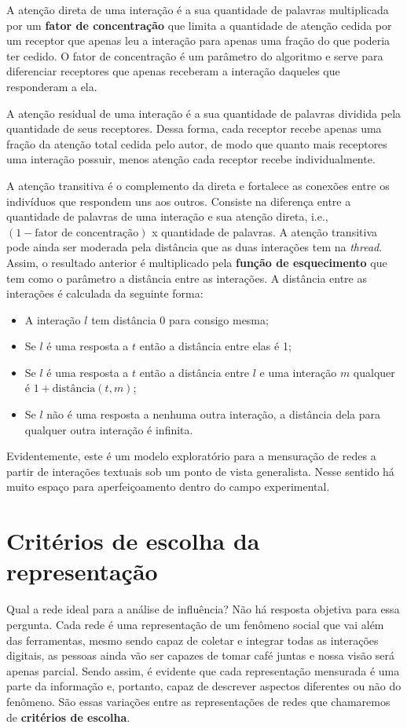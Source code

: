 A atenção direta de uma interação é a sua quantidade de palavras multiplicada
por um \textbf{fator de concentração} que limita a quantidade de atenção cedida
por um receptor que apenas leu a interação para apenas uma fração do que poderia
ter cedido. O fator de concentração é um parâmetro do algoritmo e
serve para diferenciar receptores que apenas receberam a interação
daqueles que responderam a ela. 

A atenção residual de uma interação é a sua quantidade de palavras dividida pela
quantidade de seus receptores. Dessa forma, cada receptor recebe apenas uma
fração da atenção total cedida pelo autor, de modo que quanto mais receptores
uma interação possuir, menos atenção cada receptor recebe individualmente.

A atenção transitiva é o complemento da direta e fortalece as conexões entre os
indivíduos que respondem uns aos outros. Consiste na diferença entre a
quantidade de palavras de uma interação e sua atenção direta, i.e., $(1 -
\text{fator de concentração})$ x quantidade de palavras. A atenção transitiva
pode ainda ser moderada pela distância que as duas interações tem na
\emph{thread}. Assim, o resultado anterior é multiplicado pela \textbf{função de
esquecimento} que tem como o parâmetro a distância entre as interações. A
distância entre as interações é calculada da seguinte forma:

\begin{itemize}
  \item A interação $l$ tem distância 0 para consigo mesma;
  \item Se $l$ é uma resposta a $t$ então a distância entre elas é 1;
  \item Se $l$ é uma resposta a $t$ então a distância entre $l$ e uma interação
  $m$ qualquer é $1 + \text{distância}(t, m)$;
  \item Se $l$ não é uma resposta a nenhuma outra interação, a distância dela
  para qualquer outra interação é infinita.
\end{itemize}

Evidentemente, este é um modelo exploratório para a mensuração de redes a partir
de interações textuais sob um ponto de vista generalista. Nesse sentido há muito
espaço para aperfeiçoamento dentro do campo experimental.

\section{Critérios de escolha da representação}
\label{sec:criterios}
Qual a rede ideal para a análise de influência? Não há resposta objetiva para
essa pergunta. Cada rede é uma representação de um fenômeno social que vai além
das ferramentas, mesmo sendo capaz de coletar e integrar todas as interações
digitais, as pessoas ainda vão ser capazes de tomar café juntas e nossa visão
será apenas parcial. Sendo assim, é evidente que cada representação mensurada é
uma parte da informação e, portanto, capaz de descrever aspectos diferentes ou
não do fenômeno. São essas variações entre as representações de redes que
chamaremos de \textbf{critérios de escolha}.

